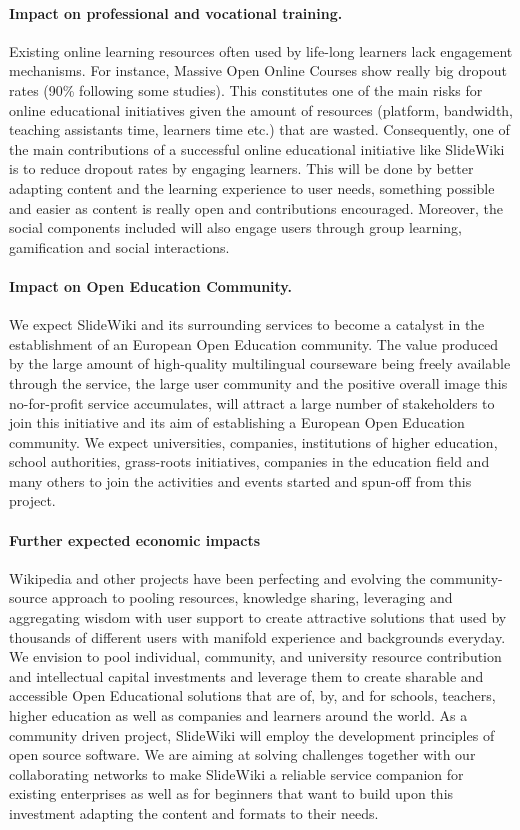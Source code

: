 \documentclass[ngerman,UKenglish,table]{scrbook}
\begin{document}
\paragraph{Impact on professional and vocational training.}
Existing online learning resources often used by life-long learners lack engagement mechanisms.
For instance, Massive Open Online Courses show really big dropout rates (90\% following some studies).
This constitutes one of the main risks for online educational initiatives given the amount of resources (platform, bandwidth, teaching assistants time, learners time etc.) that are wasted.
Consequently, one of the main contributions of a successful online educational initiative like SlideWiki is to reduce dropout rates by engaging learners.
This will be done by better adapting content and the learning experience to user needs, something possible and easier as content is really open and contributions encouraged.
Moreover, the social components included will also engage users through group learning, gamification and social interactions.

\paragraph{Impact on Open Education Community.}
We expect SlideWiki and its surrounding services to become a catalyst in the establishment of an European Open Education community.
The value produced by the large amount of high-quality multilingual courseware being freely available through the service, the large user community and the positive overall image this no-for-profit service accumulates, will attract a large number of stakeholders to join this initiative and its aim of establishing a European Open Education community.
We expect universities, companies, institutions of higher education, school authorities, grass-roots initiatives, companies in the education field and many others to join the activities and events started and spun-off from this project.

\paragraph{Further expected economic impacts}
Wikipedia and other projects have been perfecting and evolving the community-source approach to pooling resources, knowledge sharing, leveraging and aggregating wisdom with user support to create attractive solutions that used by thousands of different users with manifold experience and backgrounds everyday.
We envision to pool individual, community, and university resource contribution and intellectual capital investments and leverage them to create sharable and accessible Open Educational solutions that are of, by, and for schools, teachers, higher education as well as companies and learners around the world.
As a community driven project, SlideWiki will employ the development principles of open source software.
We are aiming at solving challenges together with our collaborating networks to make SlideWiki a reliable service companion for existing enterprises as well as for beginners that want to build upon this investment adapting the content and formats to their needs. 
\end{document}
